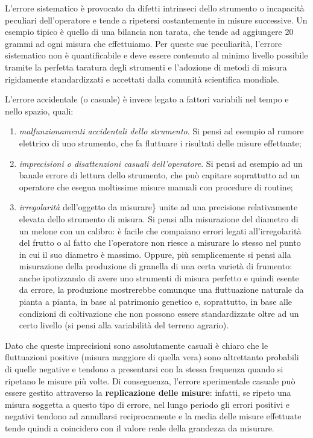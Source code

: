 \documentclass[a4paper,12pt,oneside]{book}
\providecommand{\tightlist}{%
  \setlength{\itemsep}{0pt}\setlength{\parskip}{0pt}}
\theoremstyle{definition}
\theoremstyle{definition}
\theoremstyle{definition}
\theoremstyle{remark}
\begin{document}
L'errore sistematico è provocato da difetti intrinseci dello strumento o
incapacità peculiari dell'operatore e tende a ripetersi costantemente in
misure successive. Un esempio tipico è quello di una bilancia non
tarata, che tende ad aggiungere 20 grammi ad ogni misura che
effettuiamo. Per queste sue peculiarità, l'errore sistematico non è
quantificabile e deve essere contenuto al minimo livello possibile
tramite la perfetta taratura degli strumenti e l'adozione di metodi di
misura rigidamente standardizzati e accettati dalla comunità scientifica
mondiale.

L'errore accidentale (o casuale) è invece legato a fattori variabili nel
tempo e nello spazio, quali:

\begin{enumerate}
\def\labelenumi{\arabic{enumi}.}
\tightlist
\item
  \emph{malfunzionamenti accidentali dello strumento}. Si pensi ad
  esempio al rumore elettrico di uno strumento, che fa fluttuare i
  risultati delle misure effettuate;
\item
  \emph{imprecisioni o disattenzioni casuali dell'operatore}. Si pensi
  ad esempio ad un banale errore di lettura dello strumento, che può
  capitare soprattutto ad un operatore che esegua moltissime misure
  manuali con procedure di routine;
\item
  \emph{irregolarità} dell'oggetto da misurare\} unite ad una precisione
  relativamente elevata dello strumento di misura. Si pensi alla
  misurazione del diametro di un melone con un calibro: è facile che
  compaiano errori legati all'irregolarità del frutto o al fatto che
  l'operatore non riesce a misurare lo stesso nel punto in cui il suo
  diametro è massimo. Oppure, più semplicemente si pensi alla
  misurazione della produzione di granella di una certa varietà di
  frumento: anche ipotizzando di avere uno strumenti di misura perfetto
  e quindi esente da errore, la produzione mostrerebbe comunque una
  fluttuazione naturale da pianta a pianta, in base al patrimonio
  genetico e, soprattutto, in base alle condizioni di coltivazione che
  non possono essere standardizzate oltre ad un certo livello (si pensi
  alla variabilità del terreno agrario).
\end{enumerate}

Dato che queste imprecisioni sono assolutamente casuali è chiaro che le
fluttuazioni positive (misura maggiore di quella vera) sono altrettanto
probabili di quelle negative e tendono a presentarsi con la stessa
frequenza quando si ripetano le misure più volte. Di conseguenza,
l'errore sperimentale casuale può essere gestito attraverso la
\textbf{replicazione delle misure}: infatti, se ripeto una misura
soggetta a questo tipo di errore, nel lungo periodo gli errori positivi
e negativi tendono ad annullarsi reciprocamente e la media delle misure
effettuate tende quindi a coincidero con il valore reale della grandezza
da misurare.
\end{document}

